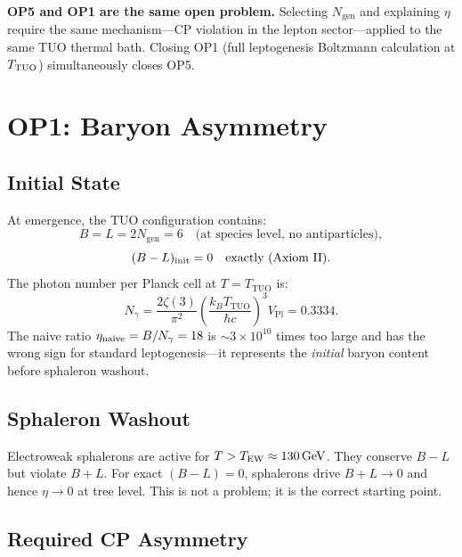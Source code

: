 \documentclass[12pt,a4paper]{article}
\theoremstyle{definition}
\newcommand{\TTUO}{T_{\mathrm{TUO}}}
\newcommand{\Ngen}{N_{\mathrm{gen}}}
\newcommand{\VPl}{V_{\mathrm{Pl}}}
\begin{document}
\begin{keybox}
\textbf{OP5 and OP1 are the same open problem.}
Selecting $\Ngen$ and explaining $\eta$ require the same
mechanism---CP violation in the lepton sector---applied to the
same TUO thermal bath.
Closing OP1 (full leptogenesis Boltzmann calculation at $T_{\rm TUO}$)
simultaneously closes OP5.
\end{keybox}

\section{OP1: Baryon Asymmetry}
\label{sec:op1}

\subsection{Initial State}

At emergence, the TUO configuration contains:
\begin{equation}
  B = L = 2\Ngen = 6 \quad \text{(at species level, no antiparticles)},
\end{equation}
\begin{equation}
  (B-L)_{\rm init} = 0 \quad \text{exactly (Axiom II).}
\end{equation}
The photon number per Planck cell at $T = \TTUO$ is:
\begin{equation}
  N_\gamma = \frac{2\zeta(3)}{\pi^2}\left(\frac{k_B\TTUO}{\hbar c}\right)^3 \VPl
  = 0.3334.
\end{equation}
The naive ratio $\eta_{\rm naive} = B/N_\gamma = 18$ is $\sim3\times10^{10}$
times too large and has the wrong sign for standard leptogenesis---it represents
the \emph{initial} baryon content before sphaleron washout.

\subsection{Sphaleron Washout}

Electroweak sphalerons are active for $T > T_{\rm EW} \approx 130\,\mathrm{GeV}$.
They conserve $B-L$ but violate $B+L$.
For exact $(B-L) = 0$, sphalerons drive $B+L \to 0$ and hence $\eta \to 0$
at tree level. This is not a problem; it is the correct starting point.

\subsection{Required CP Asymmetry}
\end{document}
